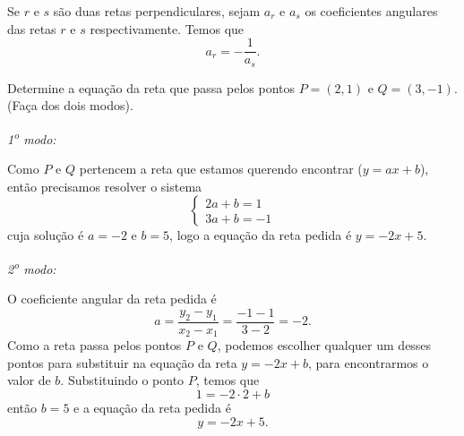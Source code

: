 \begin{observation}
  Se $r$ e $s$ são duas retas perpendiculares, sejam $a_r$ e $a_s$ os
  coeficientes angulares das retas $r$ e $s$ respectivamente. Temos que
  \[
    a_r=-\frac{1}{a_s}.
  \]
\end{observation}

\begin{example}
  Determine a equação da reta que passa pelos pontos $P=(2,1)$ e $Q=(3,-1)$.
  (Faça dos dois modos).

  \solution
  \emph{1\textsuperscript{o} modo:}

  Como $P$ e $Q$ pertencem a reta que estamos
  querendo encontrar ($y=ax+b$), então precisamos resolver o sistema
  \[
    \begin{cases}
      2a+b=1 \\
      3a+b=-1
    \end{cases}
  \]
  cuja solução é $a=-2$ e $b=5$, logo a equação da reta pedida é $y=-2x+5$.

  \emph{2\textsuperscript{o} modo:}

  O coeficiente angular da reta pedida é
  \[
    a
    = \frac{y_2-y_1}{x_2-x_1}
    = \frac{-1-1}{3-2}=-2.
  \]
  Como a reta passa pelos pontos $P$ e $Q$, podemos escolher qualquer um desses
  pontos para substituir na equação da reta $y=-2x+b$, para encontrarmos o valor
  de $b$. Substituindo o ponto $P$, temos que
  \[
    1 = -2 \cdot 2+b
  \]
  então $b=5$ e a equação da reta pedida é
  \[
    y=-2x+5.
  \]
\end{example}

